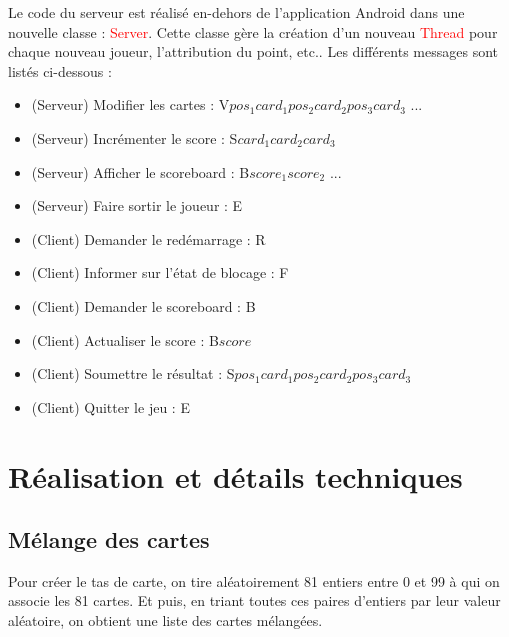 \documentclass[paper=a4, french]{scrartcl} %
\newcommand{\class}[1]{\colorbox{bg}{\textcolor{red}{\usefont{OT1}{cmtt}{m}{n}#1}}}
\begin{document}
Le code du serveur est réalisé en-dehors de l'application Android dans une nouvelle classe : \class{Server}. Cette classe gère la création d'un nouveau \class{Thread} pour chaque nouveau joueur, l'attribution du point, etc.. Les différents messages sont listés ci-dessous : 

\begin{itemize}
\item (Serveur) Modifier les cartes : V{\textvisiblespace}$pos_1${\textvisiblespace}$card_1${\textvisiblespace }$pos_2${\textvisiblespace}$card_2${\textvisiblespace}$pos_3${\textvisiblespace}$card_3$ ...
\item (Serveur) Incrémenter le score : S{\textvisiblespace}$card_1${\textvisiblespace}$card_2${\textvisiblespace}$card_3$
\item (Serveur) Afficher le scoreboard : B{\textvisiblespace}$score_1${\textvisiblespace}$score_2$ ...
\item (Serveur) Faire sortir le joueur : E
\item (Client) Demander le redémarrage : R
\item (Client) Informer sur l'état de blocage : F
\item (Client) Demander le scoreboard : B
\item (Client) Actualiser le score : B{\textvisiblespace}$score$
\item (Client) Soumettre le résultat : S{\textvisiblespace}$pos_1${\textvisiblespace}$card_1${\textvisiblespace }$pos_2${\textvisiblespace}$card_2${\textvisiblespace}$pos_3${\textvisiblespace}$card_3$
\item (Client) Quitter le jeu : E
\end{itemize}



\section{Réalisation et détails techniques}


\subsection{Mélange des cartes}
Pour créer le tas de carte, on tire aléatoirement 81 entiers entre 0 et 99 à qui on associe les 81 cartes. Et puis, en triant toutes ces paires d'entiers par leur valeur aléatoire, on obtient une liste des cartes mélangées. 
	
\end{document}
